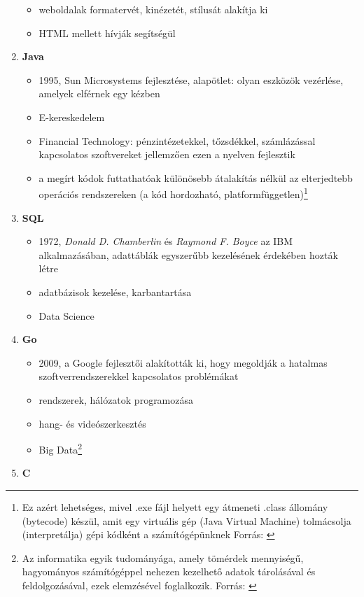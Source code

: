 \documentclass[tocnopagenum]{thesis-ekf}
\theoremstyle{definition}
\theoremstyle{remark}
\begin{document}
\begin{enumerate}
\begin{itemize}
			\item weboldalak formatervét, kinézetét, stílusát alakítja ki
			\item HTML mellett hívják segítségül
		\end{itemize}
		\item \textbf{Java}
		\begin{itemize}
			\item 1995, Sun Microsystems fejlesztése, alapötlet: olyan eszközök vezérlése, amelyek elférnek egy kézben
			\item E-kereskedelem
			\item Financial Technology: pénzintézetekkel, tőzsdékkel, számlázással kapcsolatos szoftvereket jellemzően ezen a nyelven fejlesztik
			\item a megírt kódok futtathatóak különösebb átalakítás nélkül az elterjedtebb operációs rendszereken (a kód hordozható, platformfüggetlen)\footnote{Ez azért lehetséges, mivel .exe fájl helyett egy átmeneti .class állomány (bytecode) készül, amit egy virtuális gép (Java Virtual Machine) tolmácsolja (interpretálja) gépi kódként a számítógépünknek
				Forrás: \cite{jvm}}
		\end{itemize}
		\item \textbf{SQL}
		\begin{itemize}
			\item 1972, \textit{Donald D. Chamberlin} és \textit{Raymond F. Boyce} az IBM alkalmazásában, adattáblák egyszerűbb kezelésének érdekében hozták létre
			\item adatbázisok kezelése, karbantartása
			\item Data Science
		\end{itemize}
		\item \textbf{Go}
		\begin{itemize}
			\item 2009, a Google fejlesztői alakították ki, hogy megoldják a hatalmas szoftverrendszerekkel kapcsolatos problémákat
			\item rendszerek, hálózatok programozása
			\item hang- és videószerkesztés
			\item Big Data\footnote{Az informatika egyik tudományága, amely tömérdek mennyiségű, hagyományos számítógéppel nehezen kezelhető adatok tárolásával és feldolgozásával, ezek elemzésével foglalkozik.
				Forrás: \cite{bigdata}}
		\end{itemize}
		\item \textbf{C}
		\begin{itemize}

\end{itemize}
\end{enumerate}
\end{document}
